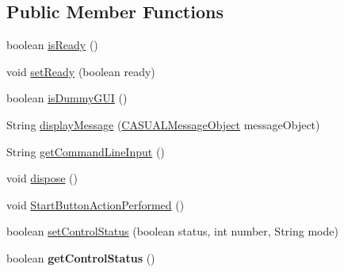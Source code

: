 \subsection*{Public Member Functions}
\begin{DoxyCompactItemize}
\item 
boolean \hyperlink{class_g_u_i_1_1_command_line_1_1_command_line_u_i_ae8c123e2111ae3e8e932711b1e0a24de}{is\-Ready} ()
\item 
void \hyperlink{class_g_u_i_1_1_command_line_1_1_command_line_u_i_a8bb70425f02ef99eb78fa56c47c57bd6}{set\-Ready} (boolean ready)
\item 
boolean \hyperlink{class_g_u_i_1_1_command_line_1_1_command_line_u_i_a2fcd587d1c6964c1f9bf825a1c0b66f0}{is\-Dummy\-G\-U\-I} ()
\item 
String \hyperlink{class_g_u_i_1_1_command_line_1_1_command_line_u_i_aba302bad91443fca75505de00bfd1a11}{display\-Message} (\hyperlink{class_c_a_s_u_a_l_1_1_c_a_s_u_a_l_message_object}{C\-A\-S\-U\-A\-L\-Message\-Object} message\-Object)
\item 
String \hyperlink{class_g_u_i_1_1_command_line_1_1_command_line_u_i_a3255f4c1749cc1795024dba0b4b15662}{get\-Command\-Line\-Input} ()
\item 
void \hyperlink{class_g_u_i_1_1_command_line_1_1_command_line_u_i_a15841dee3f6f7fea6fdb1e81753ea205}{dispose} ()
\item 
void \hyperlink{class_g_u_i_1_1_command_line_1_1_command_line_u_i_a43e58349a26d9f66a6fa8e69bcc34a58}{Start\-Button\-Action\-Performed} ()
\item 
boolean \hyperlink{class_g_u_i_1_1_command_line_1_1_command_line_u_i_abe91cb382d3a156e662780c4255723f9}{set\-Control\-Status} (boolean status, int number, String mode)
\item 
\hypertarget{class_g_u_i_1_1_command_line_1_1_command_line_u_i_a5e318f7f024f84f03da8c97fced75913}{boolean {\bfseries get\-Control\-Status} ()}\label{class_g_u_i_1_1_command_line_1_1_command_line_u_i_a5e318f7f024f84f03da8c97fced75913}


\end{DoxyCompactItemize}
